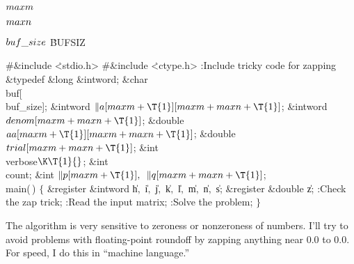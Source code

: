 \Y\B\4\D$\\{maxm}$ \5
\par
\B\4\D$\\{maxn}$ \5
\par
\B\4\D$\\{buf\_size}$ \5
\.{BUFSIZ}\par
\Y\B\8\#\&{include} \.{<stdio.h>}\6
\8\#\&{include} \.{<ctype.h>}\6
:Include tricky code for zapping\X\7
\&{typedef} \&{long} \&{intword};\6
\&{char} \\{buf}[\\{buf\_size}];\6
\&{intword} ${}\|a[\\{maxm}+\T{1}][\\{maxm}+\\{maxn}+\T{1}]{}$;\6
\&{intword} ${}\\{denom}[\\{maxm}+\\{maxn}+\T{1}]{}$;\6
\&{double} ${}\\{aa}[\\{maxm}+\T{1}][\\{maxm}+\\{maxn}+\T{1}]{}$;\6
\&{double} ${}\\{trial}[\\{maxm}+\\{maxn}+\T{1}]{}$;\6
\&{int} \\{verbose}${}\K\T{1}{}$;\6
\&{int} \\{count};\6
\&{int} ${}\|p[\\{maxm}+\T{1}],{}$ ${}\|q[\\{maxm}+\\{maxn}+\T{1}]{}$;\7
\\{main}(\,)\1\1\2\2\6
${}\{{}$\1\6
\&{register} \&{intword} \|h${},{}$ \|i${},{}$ \|j${},{}$ \|k${},{}$ \|l${},{}$
\|m${},{}$ \|n${},{}$ \|s;\6
\&{register} \&{double} \|z;\7
:Check the zap trick\X;\6
:Read the input matrix\X;\6
:Solve the problem\X;\6
\4${}\}{}$\2\par
\fi

The algorithm is very sensitive to zeroness or nonzeroness of numbers.
I'll try to avoid problems with floating-point roundoff by zapping
anything near 0.0 to 0.0. For speed, I do this in ``machine language.''

